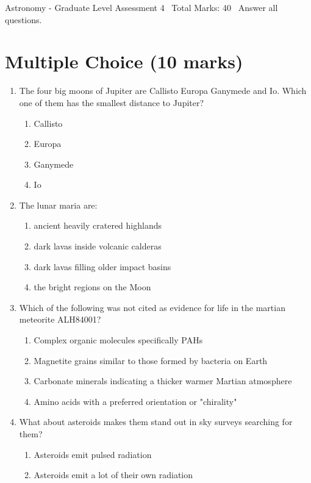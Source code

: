 \documentclass[12pt]{article}
\begin{document}
\begin{center}
Astronomy - Graduate Level Assessment 4 \
Total Marks: 40 \
Answer all questions.
\end{center}

\section*{Multiple Choice (10 marks)}
\begin{enumerate}[label=\arabic*.]
\item The four big moons of Jupiter are Callisto Europa Ganymede and Io. Which one of them has
the smallest distance to Jupiter?
\begin{enumerate}[label=(\alph*)]
    \item Callisto
    \item Europa
    \item Ganymede
    \item Io
\end{enumerate}
\item The lunar maria are:
\begin{enumerate}[label=(\alph*)]
    \item ancient heavily cratered highlands
    \item dark lavas inside volcanic calderas
    \item dark lavas filling older impact basins
    \item the bright regions on the Moon
\end{enumerate}
\item Which of the following was not cited as evidence for life in the martian meteorite
ALH84001?
\begin{enumerate}[label=(\alph*)]
    \item Complex organic molecules specifically PAHs
    \item Magnetite grains similar to those formed by bacteria on Earth
    \item Carbonate minerals indicating a thicker warmer Martian atmosphere
    \item Amino acids with a preferred orientation or "chirality"
\end{enumerate}
\item What about asteroids makes them stand out in sky surveys searching for them?
\begin{enumerate}[label=(\alph*)]
    \item Asteroids emit pulsed radiation
    \item Asteroids emit a lot of their own radiation

\end{enumerate}
\end{enumerate}
\end{document}

